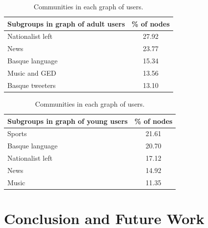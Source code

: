 \documentclass[information,article,submit,moreauthors,pdftex,10pt,a4paper]{Definitions/mdpi}
\begin{document}
\begin{table}[H]
           \centering
           \captionsetup[subtable]{position = below}
          \captionsetup[table]{position=top}
           \begin{subtable}{0.45\linewidth}
               \centering
               \begin{tabular}{lc}\hline
                   Subgroups in graph of adult users & \% of nodes \\ \hline \hline
                   Nationalist left & 27.92 \\
                   News & 23.77 \\
                   Basque language & 15.34 \\
                   Music and GED & 13.56 \\
                   Basque tweeters & 13.10 \\ \hline
               \end{tabular}
           \end{subtable}%
           \hspace*{4em}
           \begin{subtable}{0.45\linewidth}
               \centering
               \begin{tabular}{lc}\hline
                   Subgroups in graph of young users & \% of nodes \\ \hline \hline
                   Sports & 21.61 \\
                   Basque language & 20.70 \\
                   Nationalist left & 17.12 \\
                   News & 14.92 \\
                   Music & 11.35 \\ \hline
               \end{tabular}
           \end{subtable}
           \caption{Communities in each graph of users.}
           \label{tab:taldeak}
       \end{table}



\section{Conclusion and Future Work}\label{sec:conclusion}
\end{document}
